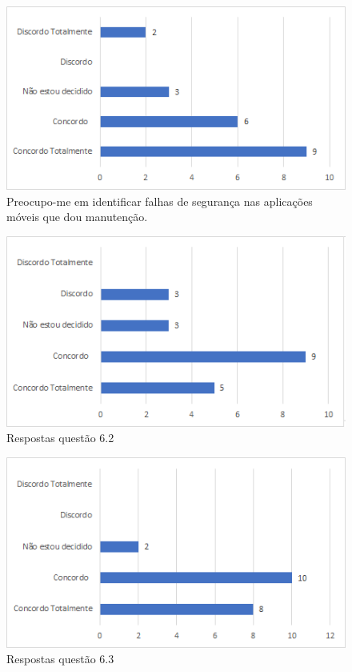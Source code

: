 \begin{figure}[!t]
\centering
\includegraphics[scale=0.7]{figuras das questoes/6.1.png}
\caption{Preocupo-me em identificar falhas de segurança nas aplicações móveis que dou manutenção.}
\end{figure}

\begin{figure}[!t]
\centering
\includegraphics[scale=0.7]{figuras das questoes/6.2.png}
\caption{Respostas questão 6.2}
\end{figure}

\begin{figure}[!t]
\centering
\includegraphics[scale=0.7]{figuras das questoes/6.3.png}
\caption{Respostas questão 6.3}
\end{figure}

